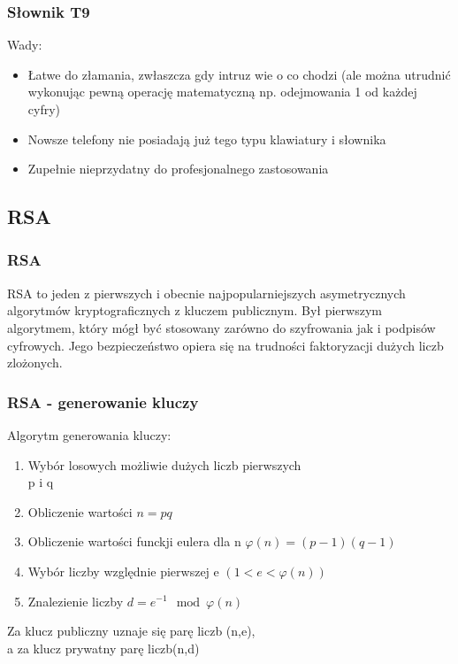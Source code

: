 \documentclass[xcolor=table]{beamer}
\begin{document}
\begin{frame}
  \frametitle{Słownik T9}
Wady:
\begin{itemize}
\item Łatwe do złamania, zwłaszcza gdy intruz wie o co chodzi (ale można utrudnić wykonując pewną  operację matematyczną np. odejmowania 1 od każdej cyfry)
\item Nowsze telefony nie posiadają już tego typu klawiatury i słownika
\item Zupełnie nieprzydatny do profesjonalnego zastosowania
\end{itemize}

\end{frame}


\subsection{RSA}

\begin{frame}
  \frametitle{RSA}
	
RSA to jeden z pierwszych i obecnie najpopularniejszych asymetrycznych algorytmów kryptograficznych z kluczem publicznym.
Był pierwszym algorytmem, który mógł być stosowany zarówno do szyfrowania jak i podpisów cyfrowych. Jego bezpieczeństwo opiera się na trudności faktoryzacji dużych liczb zlożonych.

\end{frame}



\begin{frame}
  \frametitle{RSA - generowanie kluczy}
	
	Algorytm generowania kluczy:
	\begin{enumerate}
	\item Wybór losowych możliwie dużych liczb pierwszych\\ p i q
	\item Obliczenie wartości  	\(n=pq\)
	\item Obliczenie wartości funckji eulera dla n  	\begin{math}\varphi(n)=(p-1)(q-1) 	\end{math}
	\item Wybór liczby względnie pierwszej e \begin{math}(1<e<\varphi(n))\end{math}
	\item Znalezienie liczby \begin{math}d = e^{-1} \mod \varphi(n)\end{math}
	\end{enumerate}
	Za klucz publiczny uznaje się parę liczb (n,e),\\ a za klucz prywatny parę liczb(n,d)

\end{frame}
\end{document}
